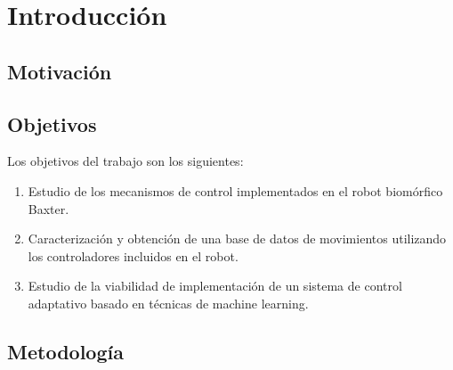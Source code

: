 \chapter{Introducción}
\section{Motivación}
\section{Objetivos}
Los objetivos del trabajo son los siguientes:
\begin{enumerate}
	\item Estudio de los mecanismos de control implementados en el robot biomórfico Baxter.
	\item Caracterización y obtención de una base de datos de movimientos utilizando los controladores incluidos en el robot.
	\item Estudio de la viabilidad de implementación de un sistema de control adaptativo basado en técnicas de machine learning.
\end{enumerate}
\section{Metodología}